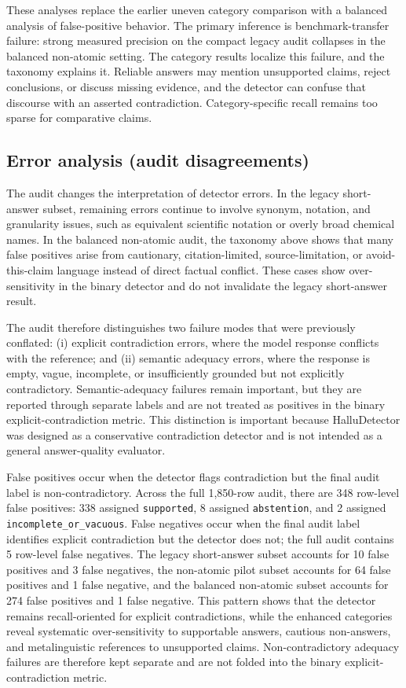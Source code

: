 \documentclass[11pt]{article}
\newcommand{\code}[1]{\texttt{#1}}
\begin{document}
These analyses replace the earlier uneven category comparison with a balanced analysis of false-positive behavior. The primary inference is benchmark-transfer failure: strong measured precision on the compact legacy audit collapses in the balanced non-atomic setting. The category results localize this failure, and the taxonomy explains it. Reliable answers may mention unsupported claims, reject conclusions, or discuss missing evidence, and the detector can confuse that discourse with an asserted contradiction. Category-specific recall remains too sparse for comparative claims.


\subsection*{Error analysis (audit disagreements)}
The audit changes the interpretation of detector errors. In the legacy short-answer subset, remaining errors continue to involve synonym, notation, and granularity issues, such as equivalent scientific notation or overly broad chemical names. In the balanced non-atomic audit, the taxonomy above shows that many false positives arise from cautionary, citation-limited, source-limitation, or avoid-this-claim language instead of direct factual conflict. These cases show over-sensitivity in the binary detector and do not invalidate the legacy short-answer result.

The audit therefore distinguishes two failure modes that were previously conflated: (i) explicit contradiction errors, where the model response conflicts with the reference; and (ii) semantic adequacy errors, where the response is empty, vague, incomplete, or insufficiently grounded but not explicitly contradictory. Semantic-adequacy failures remain important, but they are reported through separate labels and are not treated as positives in the binary explicit-contradiction metric. This distinction is important because HalluDetector was designed as a conservative contradiction detector and is not intended as a general answer-quality evaluator.

False positives occur when the detector flags contradiction but the final audit label is non-contradictory. Across the full 1,850-row audit, there are 348 row-level false positives: 338 assigned \code{supported}, 8 assigned \code{abstention}, and 2 assigned \code{incomplete\_or\_vacuous}. False negatives occur when the final audit label identifies explicit contradiction but the detector does not; the full audit contains 5 row-level false negatives. The legacy short-answer subset accounts for 10 false positives and 3 false negatives, the non-atomic pilot subset accounts for 64 false positives and 1 false negative, and the balanced non-atomic subset accounts for 274 false positives and 1 false negative. This pattern shows that the detector remains recall-oriented for explicit contradictions, while the enhanced categories reveal systematic over-sensitivity to supportable answers, cautious non-answers, and metalinguistic references to unsupported claims. Non-contradictory adequacy failures are therefore kept separate and are not folded into the binary explicit-contradiction metric.
\end{document}
